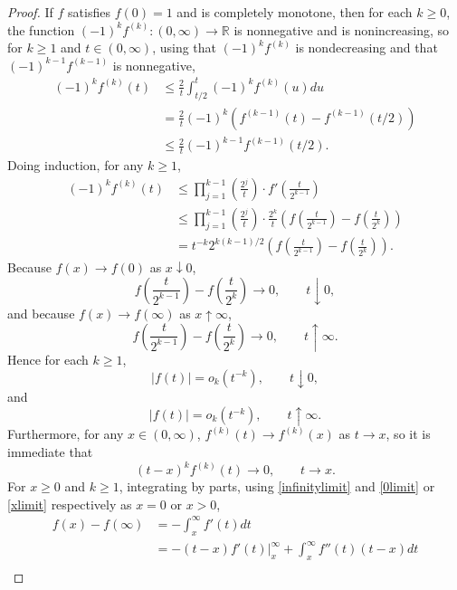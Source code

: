 \documentclass{article}
\theoremstyle{definition}
\theoremstyle{definition}
\begin{document}
\begin{proof}
If $f$ satisfies $f(0)=1$ and is completely monotone, then for each $k \geq 0$, 
the function $(-1)^{k} f^{(k)}:(0,\infty) \to \mathbb{R}$ is nonnegative and is nonincreasing, so for $k \geq 1$ and
$t \in (0,\infty)$, using that $(-1)^k f^{(k)}$ is nondecreasing and that
$(-1)^{k-1} f^{(k-1)}$ is nonnegative,
\begin{align*}
(-1)^k f^{(k)}(t)&\leq \frac{2}{t} \int_{t/2}^t (-1)^k f^{(k)}(u) du\\
&=\frac{2}{t} (-1)^k \left(f^{(k-1)}(t)-f^{(k-1)}(t/2)\right)\\
&\leq \frac{2}{t} (-1)^{k-1} f^{(k-1)}(t/2).
\end{align*}
Doing induction, for any $k \geq 1$,
\begin{align*}
(-1)^k f^{(k)}(t)&\leq \prod_{j=1}^{k-1} \left(\frac{2^j}{t}\right) \cdot f'\left(\frac{t}{2^{k-1}}\right)\\
&\leq  \prod_{j=1}^{k-1} \left(\frac{2^j}{t}\right) \cdot \frac{2^k}{t}  \left(f\left(\frac{t}{2^{k-1}}\right)-f\left(\frac{t}{2^{k}}\right)\right)\\
&=t^{-k} 2^{k(k-1)/2}  \left(f\left(\frac{t}{2^{k-1}}\right)-f\left(\frac{t}{2^{k}}\right)\right).
\end{align*}
Because $f(x) \to f(0)$ as $x \downarrow 0$,
\[
f\left(\frac{t}{2^{k-1}}\right)-f\left(\frac{t}{2^{k}}\right) \to 0,\qquad t \downarrow 0,
\]
and because $f(x) \to f(\infty)$ as $x \uparrow \infty$,
\[
f\left(\frac{t}{2^{k-1}}\right)-f\left(\frac{t}{2^{k}}\right) \to 0,\qquad t \uparrow \infty.
\]
Hence for each $k \geq 1$,
\begin{equation}
|f(t)| = o_k(t^{-k}), \qquad t \downarrow 0,
\label{0limit}
\end{equation}
and
\begin{equation}
|f(t)| = o_k(t^{-k}),\qquad t \uparrow \infty.
\label{infinitylimit}
\end{equation}
Furthermore, for any $x \in (0,\infty)$, $f^{(k)}(t) \to f^{(k)}(x)$ as $t \to x$, so it is immediate that
\begin{equation}
(t-x)^k f^{(k)}(t) \to 0,\qquad t \to x.
\label{xlimit}
\end{equation}
For $x \geq 0$ and $k \geq 1$,
integrating by parts, using  \eqref{infinitylimit} and \eqref{0limit} or  \eqref{xlimit} 
respectively as $x=0$ or $x>0$,
\begin{align*}
f(x)-f(\infty)&=-\int_x^\infty f'(t) dt\\
&=-(t-x)f'(t)\Big|_x^\infty + \int_x^\infty f''(t) (t-x) dt\\

\end{align*}
\end{proof}
\end{document}
